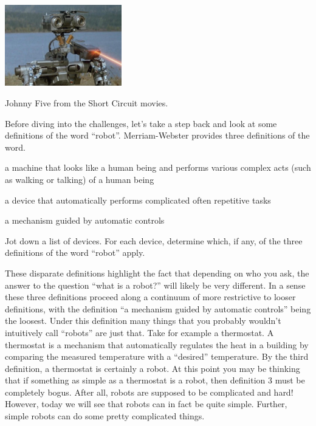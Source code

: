 \documentclass{tufte-handout}
\begin{document}
\begin{marginfigure}
\begin{center}
\includegraphics[width=2in]{figures/tumblr_ok5rq7U7TX1vy747uo1_500.jpg}
\end{center}
\caption{Johnny Five from the Short Circuit movies.}
\end{marginfigure}

Before diving into the challenges, let's take a step back and look at some definitions of the word ``robot''.  Merriam-Webster provides three definitions of the word.
\bi
\item a machine that looks like a human being and performs various complex acts (such as walking or talking) of a human being
\item a device that automatically performs complicated often repetitive tasks
\item a mechanism guided by automatic controls
\ei

\be[series=exercises, label=\textbf{Exercise} (\arabic*)]
\item Jot down a list of devices.  For each device, determine which, if any, of the three definitions of the word ``robot'' apply.
\ee


These disparate definitions highlight the fact that depending on who you ask, the answer to the question ``what is a robot?'' will likely be very different.  In a sense these three definitions proceed along a continuum of more restrictive to looser definitions, with the definition ``a mechanism guided by automatic controls'' being the loosest.  Under this definition many things that you probably wouldn't intuitively call ``robots'' are just that.  Take for example a thermostat.  A thermostat is a mechanism that automatically regulates the heat in a building by comparing the measured temperature with a ``desired'' temperature.  By the third definition, a thermostat is certainly a robot.  At this point you may be thinking that if something as simple as a thermostat is a robot, then definition 3 must be completely bogus.  After all, robots are supposed to be complicated and hard!  However, today we will see that robots can in fact be quite simple.  Further, simple robots can do some pretty complicated things.
\end{document}
